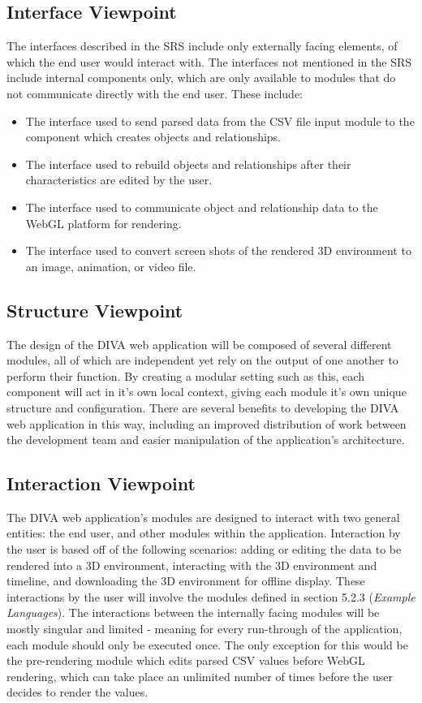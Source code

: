 \documentclass[journal,10pt,onecolumn,compsoc]{IEEEtran} \usepackage[margin=1.0in]{geometry} \usepackage{pdfpages}
\begin{document}
    \subsection{Interface Viewpoint}
        The interfaces described in the SRS include only externally facing elements, of which the end user would interact with. The interfaces not mentioned in the SRS include internal components only, which are only available to modules that do not communicate directly with the end user. These include:
        \begin{itemize}
            \item The interface used to send parsed data from the CSV file input module to the component which creates objects and relationships.
            \item The interface used to rebuild objects and relationships after their characteristics are edited by the user.
            \item The interface used to communicate object and relationship data to the WebGL platform for rendering.
            \item The interface used to convert screen shots of the rendered 3D environment to an image, animation, or video file.
        \end{itemize}
        
    \subsection{Structure Viewpoint}
        The design of the DIVA web application will be composed of several different modules, all of which are independent yet rely on the output of one another to perform their function. By creating a modular setting such as this, each component will act in it's own local context, giving each module it's own unique structure and configuration. There are several benefits to developing the DIVA web application in this way, including an improved distribution of work between the development team and easier manipulation of the application's architecture.
        
    \subsection{Interaction Viewpoint}
    The DIVA web application's modules are designed to interact with two general entities: the end user, and other modules within the application. Interaction by the user is based off of the following scenarios: adding or editing the data to be rendered into a 3D environment, interacting with the 3D environment and timeline, and downloading the 3D environment for offline display. These interactions by the user will involve the modules defined in section 5.2.3 (\textit{Example Languages}). The interactions between the internally facing modules will be mostly singular and limited - meaning for every run-through of the application, each module should only be executed once. The only exception for this would be the pre-rendering module which edits parsed CSV values before WebGL rendering, which can take place an unlimited number of times before the user decides to render the values. 
    
\end{document}
